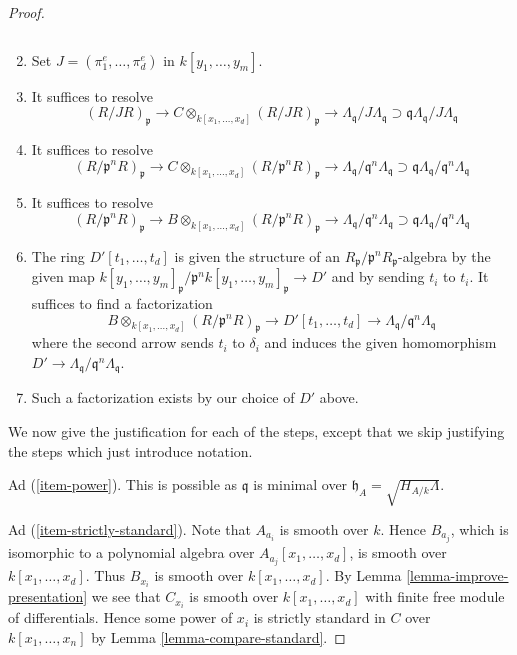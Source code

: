 \begin{proof}
\begin{enumerate}
$$$$
\item
\label{item-fourth-resolve}
Set $J = (\pi_1^e, \ldots, \pi_d^e)$ in $k[y_1, \ldots, y_m]$.
\item
\label{item-fifth-resolve}
It suffices to resolve
$$
(R/JR)_\mathfrak p \to
C \otimes_{k[x_1, \ldots, x_d]} (R/JR)_\mathfrak p \to
\Lambda_\mathfrak q/J\Lambda_\mathfrak q
\supset
\mathfrak q\Lambda_\mathfrak q/J\Lambda_\mathfrak q
$$
\item
\label{item-sixth-resolve}
It suffices to resolve
$$
(R/\mathfrak p^nR)_\mathfrak p \to
C \otimes_{k[x_1, \ldots, x_d]} (R/\mathfrak p^nR)_\mathfrak p \to
\Lambda_\mathfrak q/\mathfrak q^n\Lambda_\mathfrak q
\supset
\mathfrak q\Lambda_\mathfrak q/\mathfrak q^n\Lambda_\mathfrak q
$$
\item
\label{item-seventh-resolve}
It suffices to resolve
$$
(R/\mathfrak p^nR)_\mathfrak p \to
B \otimes_{k[x_1, \ldots, x_d]} (R/\mathfrak p^nR)_\mathfrak p \to
\Lambda_\mathfrak q/\mathfrak q^n\Lambda_\mathfrak q
\supset
\mathfrak q\Lambda_\mathfrak q/\mathfrak q^n\Lambda_\mathfrak q
$$
\item
\label{item-eigth-resolve}
The ring $D'[t_1, \ldots, t_d]$ is given the structure of an
$R_\mathfrak p/\mathfrak p^nR_\mathfrak p$-algebra by the given map
$k[y_1, \ldots, y_m]_\mathfrak p/\mathfrak p^n k[y_1, \ldots, y_m]_\mathfrak p
\to D'$ and by sending $t_i$ to $t_i$. It suffices to find a factorization
$$
B \otimes_{k[x_1, \ldots, x_d]} (R/\mathfrak p^nR)_\mathfrak p
\to D'[t_1, \ldots, t_d] \to
\Lambda_\mathfrak q/\mathfrak q^n\Lambda_\mathfrak q
$$
where the second arrow sends $t_i$ to $\delta_i$ and induces the given
homomorphism $D' \to \Lambda_\mathfrak q/\mathfrak q^n\Lambda_\mathfrak q$.
\item
\label{item-done}
Such a factorization exists by our choice of $D'$ above.
\end{enumerate}
We now give the justification for each of the steps, except that we
skip justifying the steps which just introduce notation.

\medskip\noindent
Ad (\ref{item-power}). This is possible as $\mathfrak q$ is minimal
over $\mathfrak h_A = \sqrt{H_{A/k}\Lambda}$.

\medskip\noindent
Ad (\ref{item-strictly-standard}). Note that $A_{a_i}$ is smooth
over $k$. Hence $B_{a_j}$, which is isomorphic to a polynomial
algebra over $A_{a_j}[x_1, \ldots, x_d]$, is smooth over
$k[x_1, \ldots, x_d]$. Thus $B_{x_i}$ is smooth over $k[x_1, \ldots, x_d]$.
By Lemma \ref{lemma-improve-presentation}
we see that $C_{x_i}$ is smooth over $k[x_1, \ldots, x_d]$
with finite free module of differentials. Hence some power of
$x_i$ is strictly standard in $C$ over $k[x_1, \ldots, x_n]$
by Lemma \ref{lemma-compare-standard}.


\end{proof}
